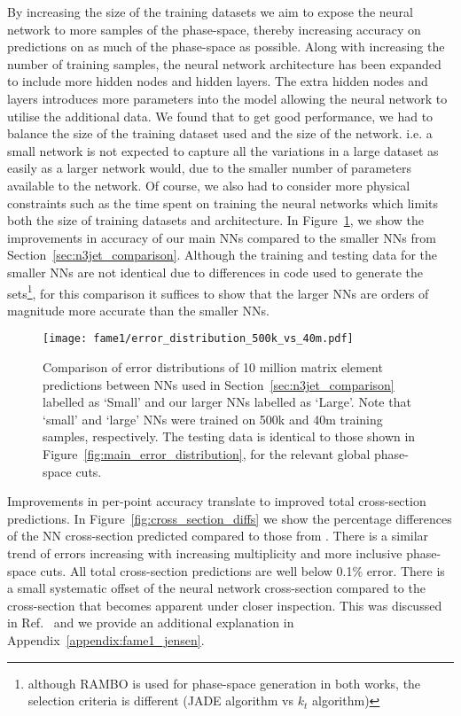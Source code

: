 \documentclass[main.tex]{subfiles}
\begin{document}
By increasing the size of the training datasets we aim to expose the neural network to more samples of the phase-space, thereby increasing accuracy on predictions on as much of the phase-space as possible.
Along with increasing the number of training samples, the neural network architecture has been expanded to include more hidden nodes and hidden layers.
The extra hidden nodes and layers introduces more parameters into the model allowing the neural network to utilise the additional data. 
We found that to get good performance, we had to balance the size of the training dataset used and the size of the network. i.e. a small network is not expected to capture all the variations in a large dataset as easily as a larger network would, due to the smaller number of parameters available to the network.
Of course, we also had to consider more physical constraints such as the time spent on training the neural networks which limits both the size of training datasets and architecture.
In Figure~\ref{fig:error_500k_vs_40m}, we show the improvements in accuracy of our main NNs compared to the smaller NNs from Section~\ref{sec:n3jet_comparison}.
Although the training and testing data for the smaller NNs are not identical due to differences in code used to generate the sets\footnote{although RAMBO is used for phase-space generation in both works, the selection criteria is different (JADE algorithm vs $k_{t}$ algorithm)}, for this comparison it suffices to show that the larger NNs are orders of magnitude more accurate than the smaller NNs.

\begin{figure}
    \centering
    \texttt{[image: fame1/error\_distribution\_500k\_vs\_40m.pdf]}
    \caption{Comparison of error distributions of 10 million matrix element predictions between NNs used in Section~\ref{sec:n3jet_comparison} labelled as `Small' and our larger NNs labelled as `Large'.
    Note that `small' and `large' NNs were trained on 500k and 40m training samples, respectively.
    The testing data is identical to those shown in Figure~\ref{fig:main_error_distribution}, for the relevant global phase-space cuts.}
    \label{fig:error_500k_vs_40m}
\end{figure}


Improvements in per-point accuracy translate to improved total cross-section predictions.
In Figure~\ref{fig:cross_section_diffs} we show the percentage differences of the NN cross-section predicted compared to those from {\NJet}.
There is a similar trend of errors increasing with increasing multiplicity and more inclusive phase-space cuts.
All total cross-section predictions are well below 0.1\% error.
There is a small systematic offset of the neural network cross-section compared to the {\NJet} cross-section that becomes apparent under closer inspection.
This was discussed in Ref.~\cite{Badger:2020uow} and we provide an additional explanation in Appendix~\ref{appendix:fame1_jensen}.
\end{document}
